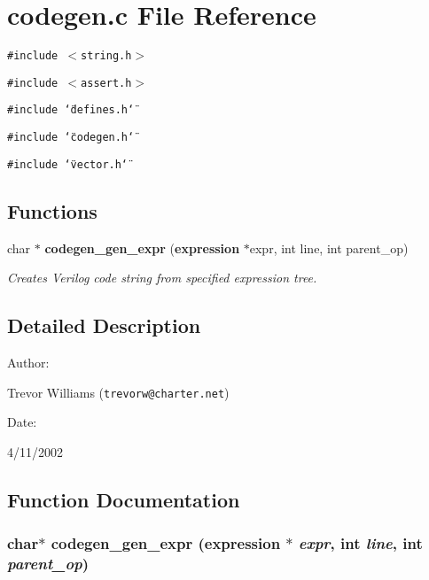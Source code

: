 \section{codegen.c File Reference}
\label{codegen_8c}
{\tt \#include $<$string.h$>$}\par
{\tt \#include $<$assert.h$>$}\par
{\tt \#include \char`\"{}defines.h\char`\"{}}\par
{\tt \#include \char`\"{}codegen.h\char`\"{}}\par
{\tt \#include \char`\"{}vector.h\char`\"{}}\par
\subsection*{Functions}
\begin{CompactItemize}
\item 
char $\ast$ {\bf codegen\_\-gen\_\-expr} ({\bf expression} $\ast$expr, int line, int parent\_\-op)
\begin{CompactList}\small\item\em Creates Verilog code string from specified expression tree.\item\end{CompactList}\end{CompactItemize}


\subsection{Detailed Description}


\begin{Desc}
\item[Author: ]\par
Trevor Williams ({\tt trevorw@charter.net}) \end{Desc}
\begin{Desc}
\item[Date: ]\par
4/11/2002\end{Desc}


\subsection{Function Documentation}
\subsubsection{\setlength{\rightskip}{0pt plus 5cm}char$\ast$ codegen\_\-gen\_\-expr ({\bf expression} $\ast$ {\em expr}, int {\em line}, int {\em parent\_\-op})}\label{codegen_8c_a0}


